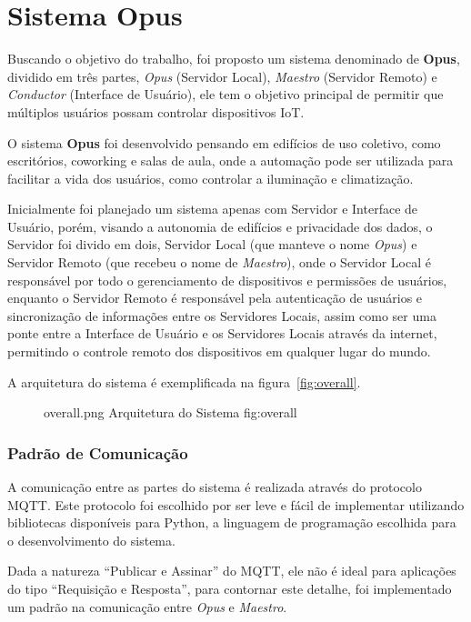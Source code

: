 \chapter{Sistema Opus}

Buscando o objetivo do trabalho, foi proposto um sistema denominado de \textbf{Opus}, dividido em três partes, 
\emph{Opus} (Servidor Local), \emph{Maestro} (Servidor Remoto) e \emph{Conductor} (Interface de Usuário), 
ele tem o objetivo principal de permitir que múltiplos usuários possam controlar dispositivos IoT.

O sistema \textbf{Opus} foi desenvolvido pensando em edifícios de uso coletivo, como escritórios, coworking e
salas de aula, onde a automação pode ser utilizada para facilitar a vida dos usuários, como controlar a iluminação e
climatização. 

Inicialmente foi planejado um sistema apenas com Servidor e Interface de Usuário, porém, visando a autonomia de edifícios e
privacidade dos dados, o Servidor foi divido em dois, Servidor Local (que manteve o nome \emph{Opus}) e Servidor Remoto (que recebeu o nome de 
\emph{Maestro}), onde o Servidor Local é responsável por todo o gerenciamento de dispositivos e permissões de usuários, 
enquanto o Servidor Remoto é responsável pela autenticação de usuários e sincronização de informações entre os Servidores Locais,
assim como ser uma ponte entre a Interface de Usuário e os Servidores Locais através da internet, permitindo o controle remoto
dos dispositivos em qualquer lugar do mundo.

A arquitetura do sistema é exemplificada na figura~\ref{fig:overall}.

\begin{figure}[h!]
    {overall.png}
    {Arquitetura do Sistema}
    {fig:overall}
\end{figure}


\subsection{Padrão de Comunicação}
\label{sec:opus-comunicacao}
A comunicação entre as partes do sistema é realizada através do protocolo MQTT.
Este protocolo foi escolhido por ser leve e fácil de implementar utilizando bibliotecas disponíveis para Python,
a linguagem de programação escolhida para o desenvolvimento do sistema. 

Dada a natureza ``Publicar e Assinar'' do MQTT,
ele não é ideal para aplicações do tipo ``Requisição e Resposta'', para contornar este detalhe, foi implementado um padrão na comunicação entre
\emph{Opus} e \emph{Maestro}.

